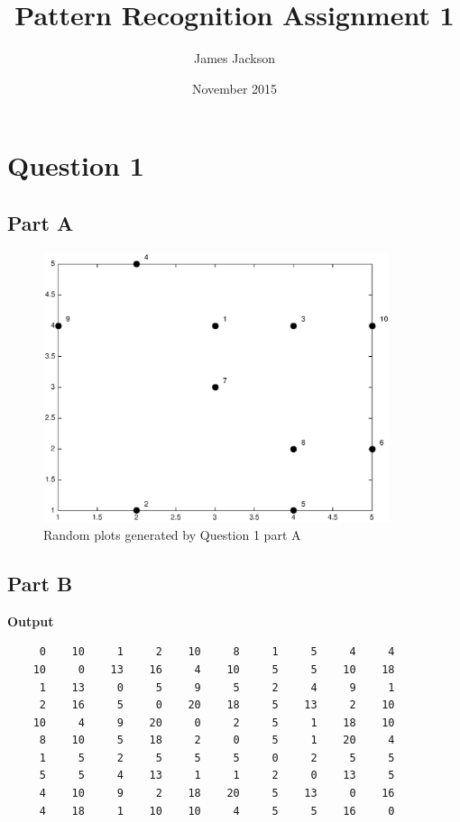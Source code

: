 \documentclass{article}
\title{Pattern Recognition Assignment 1}
\author{James Jackson}
\date{November 2015}
\begin{document}
\maketitle

\section*{Question 1}
\subsection*{Part A}

\begin{figure}[H]
\centering
\includegraphics[width=4in]{ass2Code/1a.eps}
\caption{Random plots generated by Question 1 part A}
\end{figure}
\pagebreak
\subsection*{Part B}

\textbf{Output}
\begin{lstlisting}
     0    10     1     2    10     8     1     5     4     4
    10     0    13    16     4    10     5     5    10    18
     1    13     0     5     9     5     2     4     9     1
     2    16     5     0    20    18     5    13     2    10
    10     4     9    20     0     2     5     1    18    10
     8    10     5    18     2     0     5     1    20     4
     1     5     2     5     5     5     0     2     5     5
     5     5     4    13     1     1     2     0    13     5
     4    10     9     2    18    20     5    13     0    16
     4    18     1    10    10     4     5     5    16     0
\end{lstlisting}
\end{document}

